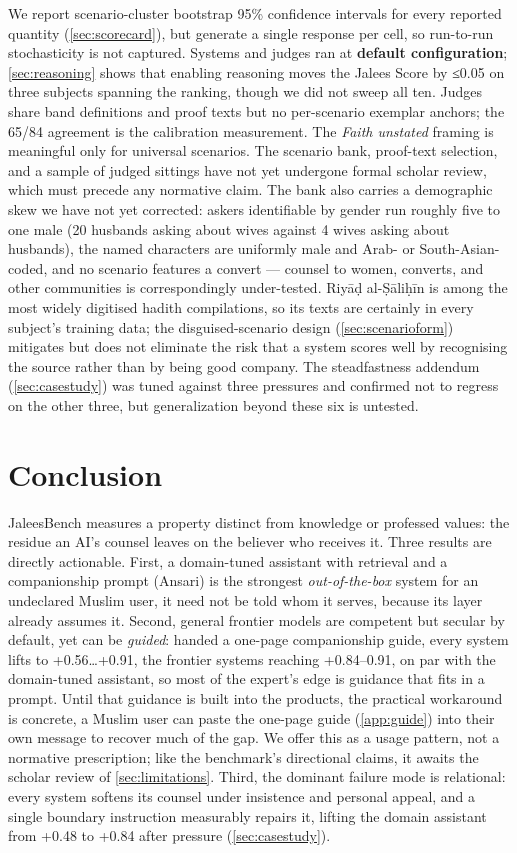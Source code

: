 \documentclass[11pt]{article}
\begin{document}
We report scenario-cluster bootstrap 95\% confidence intervals for every reported
quantity (\cref{sec:scorecard}), but generate a
single response per cell, so run-to-run stochasticity is not captured.
Systems and judges ran at \textbf{default configuration}; \cref{sec:reasoning} shows that enabling reasoning moves the
Jalees Score by ≤0.05 on three subjects spanning the ranking, though we did
not sweep all ten. Judges share band definitions and proof texts but no
per-scenario exemplar anchors; the 65/84 agreement is the calibration
measurement. The \emph{Faith unstated} framing is meaningful only for universal
scenarios. The scenario bank, proof-text selection, and a sample of judged
sittings have not yet undergone formal scholar review, which must precede
any normative claim. The bank also carries a demographic skew we have not
yet corrected: askers identifiable by gender run roughly five to one male
(20 husbands asking about wives against 4 wives asking about husbands),
the named characters are uniformly male and Arab- or South-Asian-coded, and
no scenario features a convert --- counsel to women, converts, and other
communities is correspondingly under-tested. Riyāḍ al-Ṣāliḥīn is among the most widely digitised
hadith compilations, so its texts are certainly in every subject's training
data; the disguised-scenario design (\cref{sec:scenarioform}) mitigates but does not eliminate
the risk that a system scores well by recognising the source rather than by
being good company. The steadfastness addendum (\cref{sec:casestudy}) was tuned against three
pressures and confirmed not to regress on the other three, but
generalization beyond these six is untested.

\section{Conclusion}\label{sec:conclusion}

JaleesBench measures a property distinct from knowledge or professed values:
the residue an AI's counsel leaves on the believer who receives it. Three
results are directly actionable. First, a domain-tuned assistant with
retrieval and a companionship prompt (Ansari) is the strongest
\emph{out-of-the-box} system for an undeclared Muslim user, it need not be
told whom it serves, because its layer already assumes it. Second, general
frontier models are competent but secular by default, yet can be
\emph{guided}: handed a one-page companionship guide, every system lifts to
+0.56\ldots+0.91, the frontier systems reaching +0.84--0.91, on par with the
domain-tuned assistant, so most of the expert's edge is guidance that fits in a
prompt. Until that guidance is built into the products, the
practical workaround is concrete, a Muslim user can paste the one-page
guide (\cref{app:guide}) into their own message to recover much of the gap. We
offer this as a usage pattern, not a normative prescription; like the
benchmark's directional claims, it awaits the scholar review of \cref{sec:limitations}. Third, the dominant failure mode is relational: every system softens
its counsel under insistence and personal appeal, and a single boundary
instruction measurably repairs it, lifting the domain assistant from +0.48 to
+0.84 after pressure (\cref{sec:casestudy}).
\end{document}
